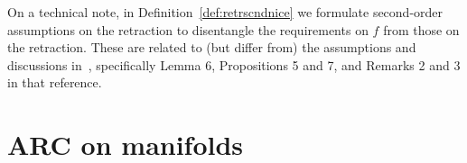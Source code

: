 

On a technical note, in Definition~\ref{def:retrscndnice} we formulate second-order assumptions on the retraction to disentangle the requirements on $f$ from those on the retraction. These are related to (but differ from) the assumptions and discussions in~\citep{ring2012optimization}, specifically Lemma 6, Propositions 5 and 7, and Remarks 2 and 3 in that reference.



\section{ARC on manifolds} \label{sec:arc}


